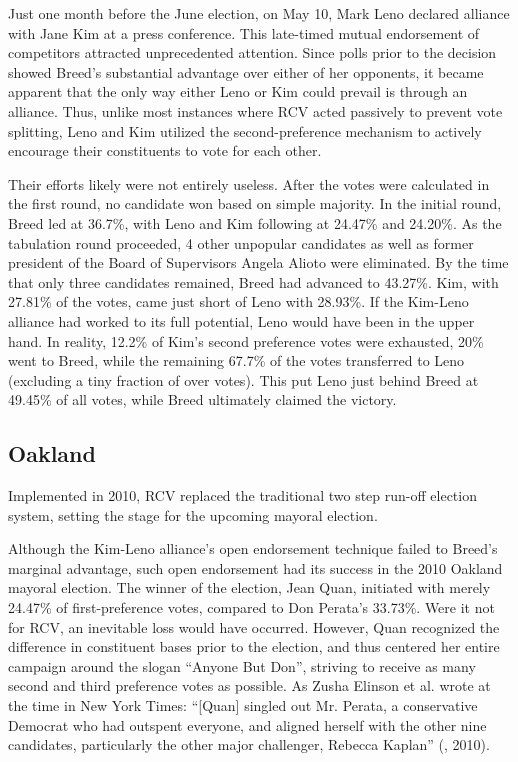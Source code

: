 Just one month before the June election, on May 10, Mark Leno declared alliance with Jane Kim at a press conference. This late-timed mutual endorsement of competitors attracted unprecedented attention. Since polls prior to the decision showed Breed’s substantial advantage over either of her opponents, it became apparent that the only way either Leno or Kim could prevail is through an alliance. Thus, unlike most instances where RCV acted passively to prevent vote splitting, Leno and Kim utilized the second-preference mechanism to actively encourage their constituents to vote for each other. 

Their efforts likely were not entirely useless. After the votes were calculated in the first round, no candidate won based on simple majority. In the initial round, Breed led at 36.7\%, with Leno and Kim following at 24.47\% and 24.20\%. As the tabulation round proceeded, 4 other unpopular candidates as well as former president of the Board of Supervisors Angela Alioto were eliminated. By the time that only three candidates remained, Breed had advanced to 43.27\%. Kim, with 27.81\% of the votes, came just short of Leno with 28.93\%. If the Kim-Leno alliance had worked to its full potential, Leno would have been in the upper hand. In reality, 12.2\% of Kim’s second preference votes were exhausted, 20\% went to Breed, while the remaining 67.7\% of the votes transferred to Leno (excluding a tiny fraction of over votes). This put Leno just behind Breed at 49.45\% of all votes, while Breed ultimately claimed the victory.

\subsection{Oakland}

Implemented in 2010, RCV replaced the traditional two step run-off election system, setting the stage for the upcoming mayoral election. 

Although the Kim-Leno alliance’s open endorsement technique failed to Breed’s marginal advantage, such open endorsement had its success in the 2010 Oakland mayoral election. The winner of the election, Jean Quan, initiated with merely 24.47\% of first-preference votes, compared to Don Perata’s 33.73\%. Were it not for RCV, an inevitable loss would have occurred. However, Quan recognized the difference in constituent bases prior to the election, and thus centered her entire campaign around the slogan “Anyone But Don”, striving to receive as many second and third preference votes as possible. As Zusha Elinson et al. wrote at the time in New York Times: “[Quan] singled out Mr. Perata, a conservative Democrat who had outspent everyone, and aligned herself with the other nine candidates, particularly the other major challenger, Rebecca Kaplan” (\cite{elinson2010}, 2010).

